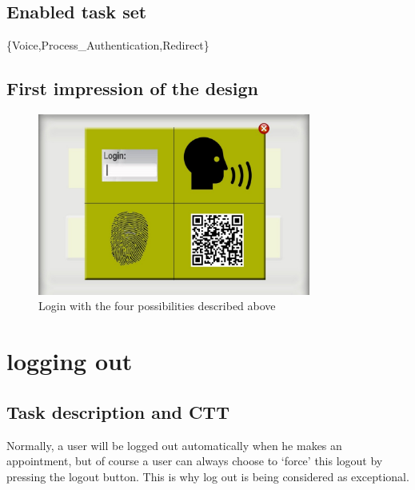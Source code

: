 \documentclass[11pt, a4paper,svglistings]{report}
\begin{document}
\subsection{Enabled task set}

\{Voice,Process\_Authentication,Redirect\}

\subsection{First impression of the design}

\begin{figure}[H]
\centering
    \includegraphics[width=0.8\textwidth]{Login.jpg}
  \caption[Login screen]{\label{fig:Login}Login with the four possibilities described above}
\end{figure}



\newpage

\section{logging out}

\subsection{Task description and CTT}

Normally, a user will be logged out automatically when he makes an appointment, but of course a user can always choose to `force' this logout by pressing the logout button. This is why log out is being considered as exceptional.
\end{document}
